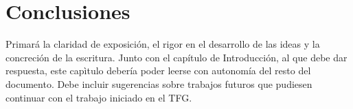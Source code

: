 \section{Conclusiones} 
 
Primará la claridad de exposición, el rigor en el desarrollo de las ideas y la concreción de la escritura. Junto con el capítulo de Introducción, al que debe dar respuesta, este capìtulo debería poder leerse con autonomía del resto del documento. Debe incluir sugerencias sobre trabajos futuros que pudiesen continuar con el trabajo iniciado en el TFG.